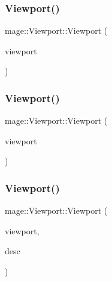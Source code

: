 \hypertarget{classmage_1_1_viewport_ae94d36685270b07e64730aa4eaad8d66}{}\label{classmage_1_1_viewport_ae94d36685270b07e64730aa4eaad8d66} 
\subsubsection{\texorpdfstring{Viewport()}{Viewport()}\hspace{0.1cm}{\footnotesize\ttfamily [8/11]}}
{\footnotesize\ttfamily mage\+::\+Viewport\+::\+Viewport (\begin{DoxyParamCaption}\item[{const \hyperlink{classmage_1_1_viewport}{Viewport} \&}]{viewport }\end{DoxyParamCaption})\hspace{0.3cm}{\ttfamily [default]}}

\hypertarget{classmage_1_1_viewport_a314686e3b925a4158418a98ba28c4fc6}{}\label{classmage_1_1_viewport_a314686e3b925a4158418a98ba28c4fc6} 
\subsubsection{\texorpdfstring{Viewport()}{Viewport()}\hspace{0.1cm}{\footnotesize\ttfamily [9/11]}}
{\footnotesize\ttfamily mage\+::\+Viewport\+::\+Viewport (\begin{DoxyParamCaption}\item[{\hyperlink{classmage_1_1_viewport}{Viewport} \&\&}]{viewport }\end{DoxyParamCaption})\hspace{0.3cm}{\ttfamily [default]}}

\hypertarget{classmage_1_1_viewport_a31a85c06722097bf1bc0e6ead39e2e8d}{}\label{classmage_1_1_viewport_a31a85c06722097bf1bc0e6ead39e2e8d} 
\subsubsection{\texorpdfstring{Viewport()}{Viewport()}\hspace{0.1cm}{\footnotesize\ttfamily [10/11]}}
{\footnotesize\ttfamily mage\+::\+Viewport\+::\+Viewport (\begin{DoxyParamCaption}\item[{const \hyperlink{classmage_1_1_viewport}{Viewport} \&}]{viewport,  }\item[{\hyperlink{namespacemage_a86cd40b8f2f42ca4d616cc6ec665a7f2}{A\+A\+Descriptor}}]{desc }\end{DoxyParamCaption})\hspace{0.3cm}{\ttfamily [explicit]}}

